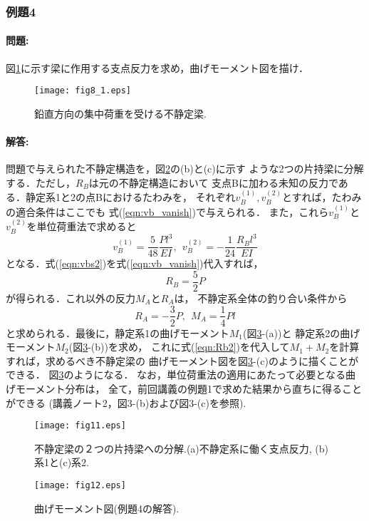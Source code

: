 ﻿\documentclass[10pt,a4j]{jarticle}
\begin{document}
\subsubsection{例題4}
\paragraph{問題:}
図\ref{fig:fig8_1}に示す梁に作用する支点反力を求め，曲げモーメント図を描け．
\begin{figure}
	\begin{center}
	\texttt{[image: fig8\_1.eps]} 
	\end{center}
	\caption{鉛直方向の集中荷重を受ける不静定梁.} 
	\label{fig:fig8_1}
\end{figure}
\paragraph{解答:}
問題で与えられた不静定構造を，図\ref{fig:fig11}の(b)と(c)に示す
ような2つの片持梁に分解する．ただし，$R_B$は元の不静定構造において
支点Bに加わる未知の反力である．静定系1と2の点Bにおけるたわみを，
それぞれ$v_B^{(1)},v_B^{(2)}$とすれば，たわみの適合条件はここでも
式(\ref{eqn:vb_vanish})で与えられる．
また，これら$v_B^{(1)}$と$v_B^{(2)}$を単位荷重法で求めると
\begin{equation}
	v_B^{(1)}=
	\frac{5}{48} \frac{Pl^3}{EI}, \ \ 
	 v_B^{(2)}=
	-\frac{1}{24} \frac{R_Bl^3}{EI}
	\label{eqn:vbs2}
\end{equation}
となる．式(\ref{eqn:vbs2})を式(\ref{eqn:vb_vanish})代入すれば，
\begin{equation}
	R_B=\frac{5}{2}P
	\label{eqn:Rb2}
\end{equation}	
が得られる．これ以外の反力$M_A$と$R_A$は，
不静定系全体の釣り合い条件から
\begin{equation}
	R_A=-\frac{3}{2}P, \ \ M_A=\frac{1}{4}Pl
	\label{eqn:}
\end{equation}
と求められる．最後に，静定系1の曲げモーメント$M_1$(図\ref{fig:fig12}-(a))と
静定系2の曲げモーメント$M_2$(図\ref{fig:fig12}-(b))を求め，
これに式(\ref{eqn:Rb2})を代入して$M_1+M_2$を計算すれば，求めるべき不静定梁の
曲げモーメント図を図\ref{fig:fig12}-(c)のように描くことができる．
図\ref{fig:fig12}のようになる．
なお，単位荷重法の適用にあたって必要となる曲げモーメント分布は，
全て，前回講義の例題1で求めた結果から直ちに得ることができる
(講義ノート2，図3-(b)および図3-(c)を参照).
\begin{figure}[h]
	\begin{center}
	\texttt{[image: fig11.eps]} 
	\end{center}
	\caption{不静定梁の２つの片持梁への分解.(a)不静定系に働く支点反力, (b)系1と(c)系2.} 
	\label{fig:fig11}
\end{figure}
\begin{figure}[h]
	\begin{center}
	\texttt{[image: fig12.eps]} 
	\end{center}
	\caption{曲げモーメント図(例題4の解答).} 
	\label{fig:fig12}
\end{figure}
\clearpage
\end{document}
